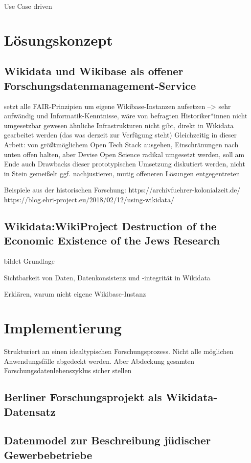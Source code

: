 \onehalfspacing

Use Case driven

\section{Lösungskonzept}
\subsection{Wikidata und Wikibase als offener Forschungsdatenmanagement-Service}
setzt alle FAIR-Prinzipien um
eigene Wikibase-Instanzen aufsetzen --> sehr aufwändig und Informatik-Kenntnisse, wäre von befragten Historiker*innen nicht umgesetzbar gewesen
ähnliche Infrastrukturen nicht gibt, direkt in Wikidata gearbeitet werden (das was derzeit zur Verfügung steht)
Gleichzeitig in dieser Arbeit: von größtmöglichem Open Tech Stack ausgehen, Einschränungen nach unten offen halten, aber Devise Open Science radikal umgesetzt werden, soll am Ende auch Drawbacks dieser prototypischen Umsetzung diskutiert werden, nicht in Stein gemeißelt ggf. nachjustieren, mutig offeneren Lösungen entgegentreten

Beispiele aus der historischen Forschung:
https://archivfuehrer-kolonialzeit.de/
https://blog.ehri-project.eu/2018/02/12/using-wikidata/


\subsection{Wikidata:WikiProject Destruction of the Economic Existence of the Jews Research}
bildet Grundlage

Sichtbarkeit von Daten, Datenkonsistenz und -integrität in Wikidata

Erklären, warum nicht eigene Wikibase-Instanz

\section{Implementierung}

Strukturiert an einen idealtypischen Forschungsprozess. Nicht alle möglichen Anwendungsfälle abgedeckt werden. Aber Abdeckung gesamten Forschungsdatenlebenszyklus sicher stellen

\subsection{Berliner Forschungsprojekt als Wikidata-Datensatz}

\subsection{Datenmodel zur Beschreibung jüdischer Gewerbebetriebe}

